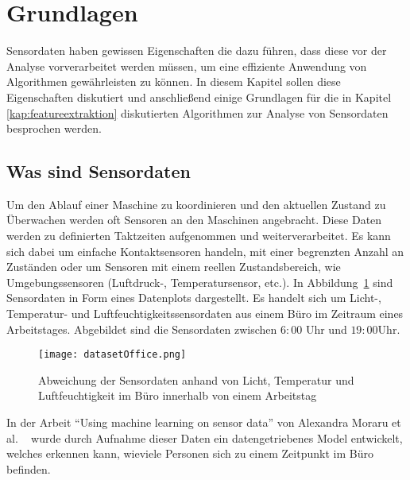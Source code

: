 \section{Grundlagen}\label{kap:grundlagen}
Sensordaten haben gewissen Eigenschaften die dazu führen, dass diese vor der Analyse vorverarbeitet werden müssen, um eine effiziente Anwendung von Algorithmen gewährleisten zu können. 
In diesem Kapitel sollen diese Eigenschaften diskutiert und anschließend einige Grundlagen für die in Kapitel \ref{kap:featureextraktion} diskutierten Algorithmen zur Analyse von Sensordaten besprochen werden.
\subsection{Was sind Sensordaten}\label{kap:sensordaten}

Um den Ablauf einer Maschine zu koordinieren und den aktuellen Zustand zu Überwachen werden oft Sensoren an den Maschinen angebracht. 
Diese Daten werden zu definierten Taktzeiten aufgenommen und weiterverarbeitet. 
Es kann sich dabei um einfache Kontaktsensoren handeln, mit einer begrenzten Anzahl an Zuständen oder um Sensoren mit einem reellen Zustandsbereich, wie Umgebungssensoren (Luftdruck-, Temperatursensor, etc.). 
In Abbildung\ \ref{fig:datasetoffice} sind Sensordaten in Form eines Datenplots dargestellt. 
Es handelt sich um Licht-, Temperatur- und Luftfeuchtigkeitssensordaten aus einem Büro im Zeitraum eines Arbeitstages. 
Abgebildet sind die Sensordaten zwischen $6:00$ Uhr und $19:00$Uhr.
\begin{figure}
    \centering
    \texttt{[image: datasetOffice.png]}
    \caption{Abweichung der Sensordaten anhand von Licht, Temperatur und Luftfeuchtigkeit im Büro innerhalb von einem Arbeitstag~\cite{moraru2010using}}
    \label{fig:datasetoffice}
\end{figure}

In der Arbeit \enquote{Using machine learning on sensor data} von Alexandra Moraru et al. ~\cite{moraru2010using} wurde durch Aufnahme dieser Daten ein datengetriebenes Model entwickelt, welches erkennen kann, wieviele Personen sich zu einem Zeitpunkt im Büro befinden.


